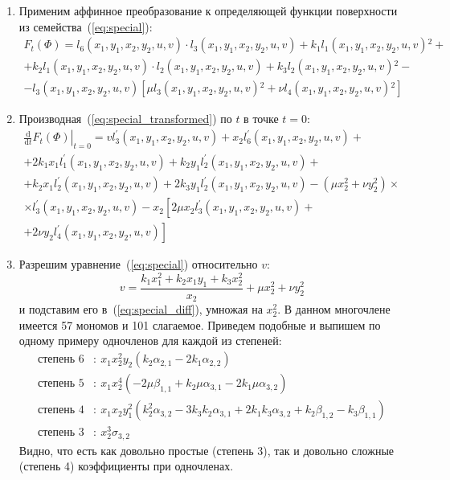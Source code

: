 \documentclass[../main.tex]{subfiles}
\begin{document}
\begin{enumerate}
\item Применим аффинное преобразование к определяющей функции поверхности из семейства~(\ref{eq:special}):
\begin{multline}\label{eq:special_transformed}
F_t(\Phi) = l_6(x_1, y_1, x_2, y_2, u, v) \cdot l_3(x_1, y_1, x_2, y_2, u, v) + k_1 l_1(x_1, y_1, x_2, y_2, u, v){}^2 + \\ + k_2 l_1(x_1, y_1, x_2, y_2, u, v)\cdot l_2(x_1, y_1, x_2, y_2, u, v) + k_3 l_2(x_1, y_1, x_2, y_2, u, v){}^2 - \\
- l_3(x_1, y_1, x_2, y_2, u, v) \left[\mu l_3(x_1, y_1, x_2, y_2, u, v){}^2+\nu  l_4(x_1, y_1, x_2, y_2, u, v){}^2\right]
\end{multline}

\item Производная~(\ref{eq:special_transformed}) по $t$ в точке $t = 0$:
\begin{multline}\label{eq:special_diff}
\left.\frac{\mathrm d}{\mathrm{d}t} F_t\left(\Phi\right)\right|_{t = 0} = v l_3^{\prime}(x_1, y_1, x_2, y_2, u, v) + x_2 l_6^{\prime}(x_1, y_1, x_2, y_2, u, v) + \\
+ 2 k_1 x_1 l_1^{\prime}(x_1, y_1, x_2, y_2, u, v) + k_2 y_1 l_2^{\prime}(x_1, y_1, x_2, y_2, u, v) + \\
+ k_2 x_1 l_2^{\prime}(x_1, y_1, x_2, y_2, u, v) +2 k_3 y_1 l_2^{\prime}(x_1, y_1, x_2, y_2, u, v) - \left(\mu x_2^2+\nu  y_2^2\right) \times \\
\times l_3^{\prime}(x_1, y_1, x_2, y_2, u, v) - x_2 \left[2 \mu  x_2 l_3^{\prime}(x_1, y_1, x_2, y_2, u, v) + \right. \\
\left. +2 \nu  y_2 l_4^{\prime}(x_1, y_1, x_2, y_2, u, v)\right]
\end{multline}

\item Разрешим уравнение~(\ref{eq:special}) относительно $v$:
$$
v = \frac{k_1 x_1^2 + k_2 x_1 y_1 + k_3 x_2^2}{x_2} +  \mu x_2^2 + \nu y_2^2
$$
и подставим его в~(\ref{eq:special_diff}), умножая на $x_2^2$. В данном многочлене имеется 57 мономов и 101 слагаемое. Приведем подобные и выпишем по одному примеру одночленов для каждой из степеней:
\begin{align*}
\text{степень 6}&:\ x_1 x_2^2 y_2 \left(k_2 \alpha _{2,1}-2 k_1 \alpha _{2,2}\right) \\
\text{степень 5}&:\ x_1 x_2^4 \left(-2 \mu  \beta _{1,1}+k_2 \mu  \alpha _{3,1}-2 k_1 \mu  \alpha _{3,2}\right) \\
\text{степень 4}&:\ x_1 x_2 y_1^2 \left(k_2^2 \alpha _{3,2}-3 k_3 k_2 \alpha _{3,1}+2 k_1 k_3 \alpha _{3,2}+k_2 \beta _{1,2}-k_3 \beta _{1,1}\right) \\
\text{степень 3}&:\ x_2^3 \sigma _{3,2}
\end{align*}
Видно, что есть как довольно простые (степень 3), так и довольно сложные (степень 4) коэффициенты при одночленах.


\end{enumerate}
\end{document}
